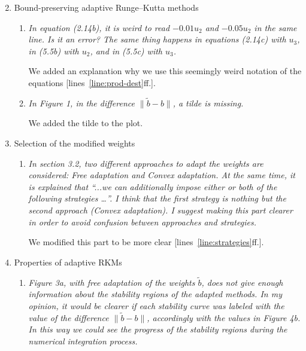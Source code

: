 \documentclass[11pt]{letter}
\begin{document}
\begin{letter}{}
\begin{enumerate}[label=\arabic*.]
  \setcounter{enumi}{1}
  \item Bound-preserving adaptive Runge–Kutta methods
  \begin{enumerate}[label=\alph*)]
    \item \emph{%
    In equation (2.14b), it is weird to read $-0.01 u_2$ and $- 0.05 u_2$
    in the same line. Is it an error? The same thing happens in equations (2.14c)
    with $u_3$, in (5.5b) with $u_2$, and in (5.5c) with $u_3$.
    }

    We added an explanation why we use this seemingly weird notation of the
    equations [lines~\ref{line:prod-dest}ff.].


    \item \emph{%
    In Figure 1, in the difference $\| \tilde b - b \|$, a tilde is missing.
    }

    We added the tilde to the plot.
  \end{enumerate}


  \item Selection of the modified weights
  \begin{enumerate}[label=\alph*)]
    \item \emph{%
    In section 3.2, two different approaches to adapt the weights are considered:
    Free adaptation and Convex adaptation. At the same time, it is explained that
    ``...we can additionally impose either or both of the following strategies \dots''.
    I think that the first strategy is nothing but the second approach (Convex
    adaptation). I suggest making this part clearer in order to avoid confusion
    between approaches and strategies.
    }

    We modified this part to be more clear [lines~\ref{line:strategies}ff.].
  \end{enumerate}


  \item Properties of adaptive RKMs
  \begin{enumerate}[label=\alph*)]
    \item \emph{%
    Figure 3a, with free adaptation of the weights $\tilde b$, does not give enough
    information about the stability regions of the adapted methods. In my opinion,
    it would be clearer if each stability curve was labeled with the value of
    the difference $\| \tilde b - b \|$, accordingly with the values in Figure 4b.
    In this way we could see the progress of the stability regions during the
    numerical integration process.
    }


\end{enumerate}
\end{enumerate}
\end{letter}
\end{document}

